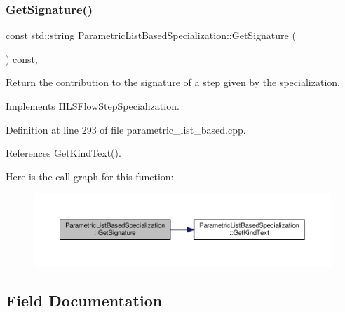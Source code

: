 \subsubsection{\texorpdfstring{Get\+Signature()}{GetSignature()}}
{\footnotesize\ttfamily const std\+::string Parametric\+List\+Based\+Specialization\+::\+Get\+Signature (\begin{DoxyParamCaption}{ }\end{DoxyParamCaption}) const\hspace{0.3cm}{\ttfamily [override]}, {\ttfamily [virtual]}}



Return the contribution to the signature of a step given by the specialization. 



Implements \hyperlink{classHLSFlowStepSpecialization_ae8c6ce8a3495c93e8a8edc01d8727023}{H\+L\+S\+Flow\+Step\+Specialization}.



Definition at line 293 of file parametric\+\_\+list\+\_\+based.\+cpp.



References Get\+Kind\+Text().

Here is the call graph for this function\+:
\nopagebreak
\begin{figure}[H]
\begin{center}
\leavevmode
\includegraphics[width=350pt]{de/d49/classParametricListBasedSpecialization_ab4a9c8147842a19814c43444a8d502d6_cgraph}
\end{center}
\end{figure}


\subsection{Field Documentation}
\mbox{\label{classParametricListBasedSpecialization_a16d8f9b3c3b1ad1a1544bb721f284b69}} 
